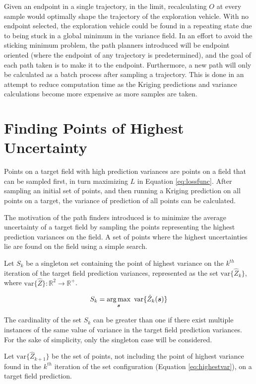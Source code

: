 Given an endpoint in a single trajectory, in the limit, recalculating $O$ at every sample would optimally shape the trajectory of the exploration vehicle. With no endpoint selected, the exploration vehicle could be found in a repeating state due to being stuck in a global minimum in the variance field. In an effort to avoid the sticking minimum problem, the path planners introduced will be endpoint oriented (where the endpoint of any trajectory is predetermined), and the goal of each path taken is to make it to the endpoint. Furthermore, a new path will only be calculated as a batch process after sampling a trajectory. This is done in an attempt to reduce computation time as the Kriging predictions and variance calculations become more expensive as more samples are taken.

\section{Finding Points of Highest Uncertainty} \label{sec:highestvars}
Points on a target field with high prediction variances are points on a field that can be sampled first, in turn maximizing $L$ in Equation \ref{eq:lossfunc}. After sampling an initial set of points, and then running a Kriging prediction on all points on a target, the variance of prediction of all points can be calculated.

The motivation of the path finders introduced is to minimize the average uncertainty of a target field by sampling the points representing the highest prediction variances on the field. A set of points where the highest uncertainties lie are found on the field using a simple search.

Let $S_k$ be a singleton set containing the point of highest variance on the $k^{th}$ iteration of the target field prediction variances, represented as the set $\text{var}\{\hat{Z}_k\}$, where $\text{var}\{\hat{Z}\} : \mathbb{R}^2 \to \mathbb{R}^+$.

\begin{equation}
	S_{k} = \argmax_{\vect{s}} \ \text{var}\{\hat{Z}_{k}(\vect{s})\}
	\label{eq:highestvar}
\end{equation}

\noindent The cardinality of the set $S_k$ can be greater than one if there exist multiple instances of the same value of variance in the target field prediction variances. For the sake of simplicity, only the singleton case will be considered.

Let $\text{var}\{\hat{Z}_{k+1}\}$ be the set of points, not including the point of highest variance found in the $k^{th}$ iteration of the set configuration (Equation \ref{eq:highestvar}), on a target field prediction.

